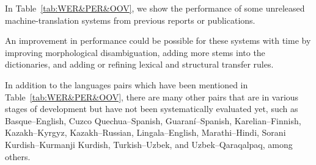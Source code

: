 \documentclass[free]{flammie}
\begin{document}
\begin{table*}[t]
\centering
\caption{A selection of unreleased translation pairs with published results.
    Coverage is the percentage of tokens which receive at least one analysis
    from the morphological analyser. WER (Word Error Rate), PER
    (Position-independent Word Error Rate), and BLEU scores are computed against
    a reference translation. A relatively low WER/PER score or a relatively high
    BLEU score generally denotes better translation quality.}
\label{tab:WER&PER&OOV}
\end{table*}


In Table~\ref{tab:WER&PER&OOV}, we show the performance of some unreleased
machine-translation systems from previous reports or publications.

An improvement in performance could be possible for these systems with time by
improving morphological disambiguation, adding more stems into the dictionaries,
and adding or refining lexical and structural transfer rules.

In addition to the languages pairs which have been mentioned in
Table~\ref{tab:WER&PER&OOV}, there are many other pairs that are in various
stages of development but have not been systematically evaluated yet, such as
Basque--English, Cuzco Quechua--Spa\-nish, Guaraní--Spa\-nish,
Karelian--Finnish, Kazakh--Kyrgyz, Kazakh--Russian, Lingala--English,
Marathi--Hin\-di, Sorani Kurdish--Kurmanji Kurdish, Turkish--Uzbek, and
Uzbek--Qaraqalpaq, among others.
\end{document}
